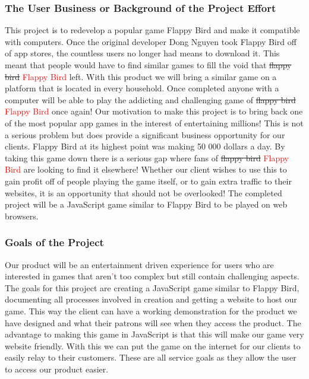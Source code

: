 \documentclass[11pt, oneside]{article}   	%
\begin{document}
\subsubsection{The User Business or Background of the Project Effort}
This project is to redevelop a popular game Flappy Bird and make it compatible with computers. Once the original developer Dong Nguyen took Flappy Bird off of app stores, the countless users no longer had means to download it. This meant that people would have to find similar games to fill the void that \sout{flappy bird} \textcolor{red}{Flappy Bird} left. With this product we will bring a similar game on a platform that is located in every household. Once completed anyone with a computer will be able to play the addicting and challenging game of \sout{flappy bird} \textcolor{red}{Flappy Bird} once again! Our motivation to make this project is to bring back one of the most popular app games in the interest of entertaining millions! This is not a serious problem but does provide a significant business opportunity for our clients. Flappy Bird at its highest point was making 50 000 dollars a day. By taking this game down there is a serious gap where fans of  \sout{flappy bird} \textcolor{red}{Flappy Bird} are looking to find it elsewhere! Whether our client wishes to use this to gain profit off of people playing the game itself, or to gain extra traffic to their websites, it is an opportunity that should not be overlooked! The completed project will be a JavaScript game similar to Flappy Bird to be played on web browsers. 


\subsubsection{Goals of the Project}
Our product will be an entertainment driven experience for users who are interested in games that aren\textcolor{red}{'}t too complex but still contain challenging aspects. The goals for this project are creating a JavaScript game similar to Flappy Bird, documenting all processes involved in creation and getting a website to host our game. This way the client can have a working demonstration for the product we have designed and what their patrons will see when they access the product. The advantage to making this game in JavaScript is that this will make our game very website friendly. With this we can put the game on the internet for our clients to easily relay to their customers.  These are all service goals as they allow the user to access our product easier.
\end{document}
